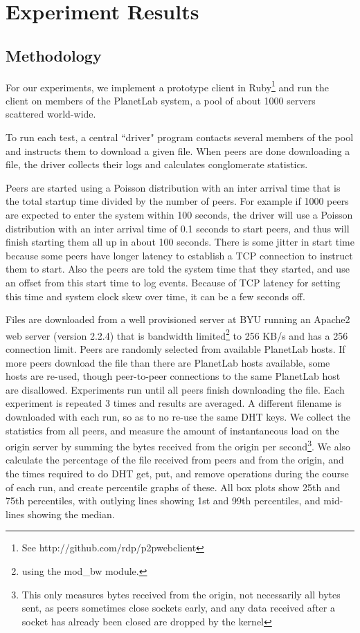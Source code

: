 
\section{Experiment Results}

\subsection {Methodology} 

For our experiments, we implement a prototype client in Ruby\footnote{See http://github.com/rdp/p2pwebclient} and 
run the client on members of the PlanetLab system, a pool of about 1000 servers scattered world-wide.

To run each test, a central ``driver" program contacts several members of the pool and instructs them to download a given file.
When peers are done downloading a file, the driver collects their logs and calculates conglomerate statistics.

Peers are started using a Poisson distribution with an inter arrival time that is the total startup time divided by the number of peers.
For example if 1000 peers are expected to enter the system within 100 seconds, the driver
will use a Poisson distribution with an inter arrival time of 0.1 seconds to start peers, and thus will finish 
starting them all up in about 100 seconds.  There is some jitter in start time because some peers have longer latency to establish a TCP connection
to instruct them to start.  Also the peers are told the system time that they started, and use an offset from this start time to log events.  Because of TCP
latency for setting this time and system clock skew over time, it can be a few seconds off.

Files are downloaded from a well provisioned server at BYU running an Apache2 web server (version 2.2.4) that is
bandwidth limited\footnote{using the mod\_bw module.} to 256 KB/s and has a 256 connection limit. 
Peers are randomly selected from available PlanetLab hosts.  If more peers download the file than
there are PlanetLab hosts available, some hosts are re-used, though peer-to-peer connections to the same PlanetLab
host are disallowed.  Experiments run until 
all peers finish downloading the file. Each experiment is repeated 3 times and results are averaged. 
A different filename is downloaded with each run, so as to no re-use the same DHT keys. We collect the statistics from all peers, 
and measure the amount of instantaneous load on the origin server by summing the 
bytes received from the origin per second\footnote{This only measures bytes received from the origin, not necessarily all bytes sent, 
as peers sometimes close sockets early, and any data received after a socket has already been closed are dropped by the kernel}.
We also calculate the percentage of the file received from peers and from the origin, and the times required to do DHT 
get, put, and remove operations during the course of each run, and create percentile graphs of these.  
All box plots show 25th and 75th percentiles, with outlying lines showing 1st and 99th percentiles, and mid-lines showing the median.

